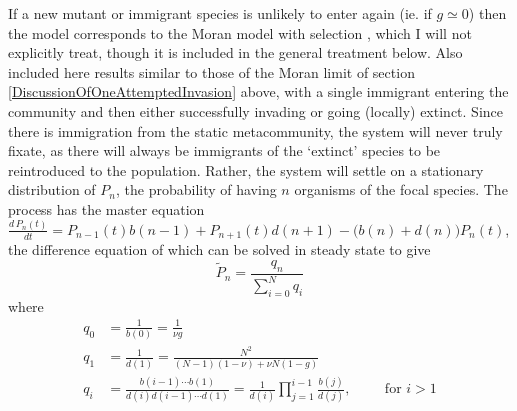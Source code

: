 If a new mutant or immigrant species is unlikely to enter again (ie. if $g\simeq 0$) then the model corresponds to the Moran model with selection \cite{Taylor2004,Claussen2005,Lambert2006,Blythe2007,Parsons2007,Pigolotti2013,Chalub2016,Czuppon2017}, which I will not explicitly treat, though it is included in the general treatment below. %
Also included here results similar to those of the Moran limit of section \ref{DiscussionOfOneAttemptedInvasion} above, with a single immigrant entering the community and then either successfully invading or going (locally) extinct. 
Since there is immigration from the static metacommunity, the system will never truly fixate, as there will always be immigrants of the `extinct' species to be reintroduced to the population.  
Rather, the system will settle on a stationary distribution of $P_n$, the probability of having $n$ organisms of the focal species. 
The process has the master equation $\frac{d\,P_n(t)}{dt} = P_{n-1}(t)b(n-1) + P_{n+1}(t)d(n+1) - \big(b(n)+d(n)\big)P_n(t)$,
the difference equation of which can be solved in steady state to give
\begin{equation}
\widetilde{P}_n = \frac{q_n}{\sum_{i=0}^N q_i}
\end{equation}
where
\begin{align*}
 q_0 &= \frac{1}{b(0)} = \frac{1}{\nu g} \\
 q_1 &= \frac{1}{d(1)} = \frac{N^2}{(N-1)(1-\nu) + \nu N(1-g)} \\
 q_i &= \frac{b(i-1)\cdots b(1)}{d(i)d(i-1)\cdots d(1)} = \frac{1}{d(i)}\prod_{j=1}^{i-1}\frac{b(j)}{d(j)}, \hspace{1cm} \text{for }i > 1
\end{align*}
